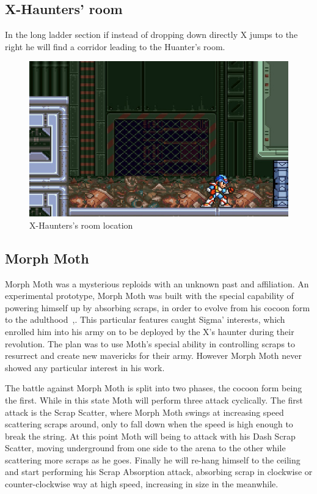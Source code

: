 \subsection{X-Haunters' room}
In the long ladder section if instead of dropping down directly X jumps to the right he will find a corridor leading to the Huanter's room.

\begin{figure}[htp]
	\centering
	\includegraphics[width=0.8\linewidth]{figures/X2/Morph_moth/Moth_haunter_room.jpg}
	\caption{X-Haunters's room location}
\end{figure}

\subsection{Morph Moth}\label{boss:Morph_moth}
Morph Moth was a mysterious reploids with an unknown past and affiliation. An experimental prototype, Morph Moth was built with the special capability  of powering himself up by absorbing scraps, in order to evolve from his cocoon form to the adulthood~\cite{wiki:Morph_moth},\cite{wayback:X2_resources}. This particular features caught Sigma' interests, which enrolled him into his army on to be deployed by the X's haunter during their revolution. The plan was to use Moth's special ability in controlling scraps to resurrect and create new mavericks for their army. However Morph Moth never showed any particular interest in his work.

The battle against Morph Moth is split into two phases, the cocoon form being the first. While in this state Moth will perform three attack cyclically. The first attack is the Scrap Scatter, where Morph Moth swings at increasing speed scattering scraps around, only to fall down when the speed is high enough to break the string. At this point Moth will being to attack with his Dash Scrap Scatter, moving underground from one side to the arena to the other while scattering more scraps as he goes. Finally he will re-hang himself to the ceiling and start performing his Scrap Absorption attack, absorbing scrap in clockwise or counter-clockwise way at high speed, increasing in size in the meanwhile. 

